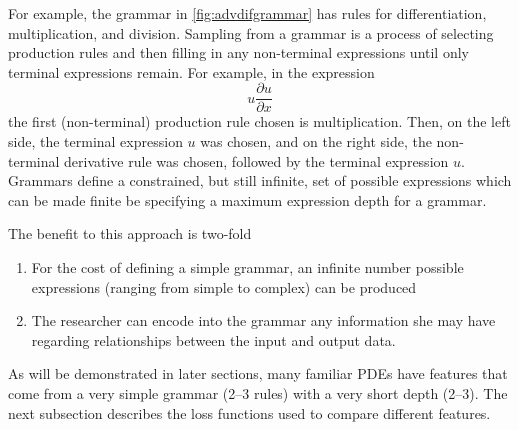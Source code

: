\documentclass{article}
\begin{document}
For example, the grammar in \cref{fig:advdifgrammar} has rules for differentiation, multiplication, and division. Sampling from a grammar is a process of selecting production rules and then filling in any non-terminal expressions until only terminal expressions remain. For example, in the expression 
\begin{equation}
    u \frac{\partial u}{\partial x }
\end{equation}
the first (non-terminal) production rule chosen is multiplication. Then, on the left side, the terminal expression $u$ was chosen, and on the right side, the non-terminal derivative rule was chosen, followed by the terminal expression $u$. Grammars define a constrained, but still infinite, set of possible expressions which can be made finite be specifying a maximum expression depth for a grammar. 

The benefit to this approach is two-fold
\begin{enumerate}
    \item For the cost of defining a simple grammar, an infinite number possible expressions (ranging from simple to complex) can be produced
    \item The researcher can encode into the grammar any information she may have regarding relationships between the input and output data.
\end{enumerate}
As will be demonstrated in later sections, many familiar PDEs have features that come from a very simple grammar (2--3 rules) with a very short depth (2--3). The next subsection describes the loss functions used to compare different features.  
\end{document}
